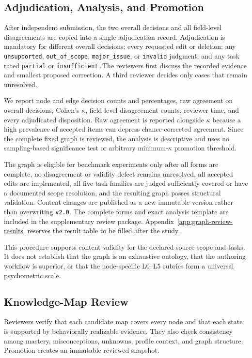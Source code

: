 \subsection{Adjudication, Analysis, and Promotion}

After independent submission, the two overall decisions and all field-level disagreements are copied into a single adjudication record. Adjudication is mandatory for different overall decisions; every requested edit or deletion; any \texttt{unsupported}, \texttt{out\_of\_scope}, \texttt{major\_issue}, or \texttt{invalid} judgment; and any task rated \texttt{partial} or \texttt{insufficient}. The reviewers first discuss the recorded evidence and smallest proposed correction. A third reviewer decides only cases that remain unresolved.

We report node and edge decision counts and percentages, raw agreement on overall decisions, Cohen's $\kappa$, field-level disagreement counts, reviewer time, and every adjudicated disposition. Raw agreement is reported alongside $\kappa$ because a high prevalence of accepted items can depress chance-corrected agreement. Since the complete fixed graph is reviewed, the analysis is descriptive and uses no sampling-based significance test or arbitrary minimum-$\kappa$ promotion threshold.

The graph is eligible for benchmark experiments only after all forms are complete, no disagreement or validity defect remains unresolved, all accepted edits are implemented, all five task families are judged sufficiently covered or have a documented scope resolution, and the resulting graph passes structural validation. Content changes are published as a new immutable version rather than overwriting \texttt{v2.0}. The complete forms and exact analysis template are included in the supplementary review package. Appendix~\ref{app:graph-review-results} reserves the result table to be filled after the study.

This procedure supports content validity for the declared source scope and tasks. It does not establish that the graph is an exhaustive ontology, that the authoring workflow is superior, or that the node-specific L0--L5 rubrics form a universal psychometric scale.

\subsection{Knowledge-Map Review}

Reviewers verify that each candidate map covers every node and that each state is supported by behaviorally realizable evidence. They also check consistency among mastery, misconceptions, unknowns, profile context, and graph structure. Promotion creates an immutable reviewed snapshot.

